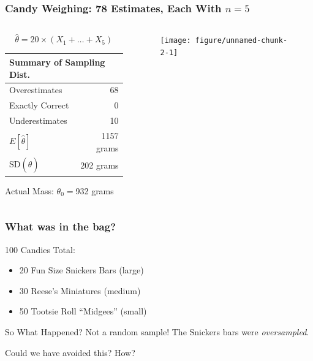 \begin{frame}[fragile]



\frametitle{Candy Weighing: 78 Estimates, Each With $n=5$}

\begin{columns} 
\begin{column}[c]{5cm} 
\small

$$\widehat{\theta} = 20 \times (X_1 + \hdots + X_5)$$

\small
   \begin{tabular}{lr}
   \hline \hline
   \multicolumn{2}{l}{Summary of Sampling Dist.} \\
   \hline
   Overestimates& 68\\
   Exactly Correct& 0\\
   Underestimates& 10\\
   \hline
   $E[\hat{\theta}]$& 1157 grams\\
   SD$(\widehat{\theta})$& 202 grams\\
   \hline
   \end{tabular}
   
  \vspace{1em}
  Actual Mass:  $\theta_0 =$932 grams
\end{column} 
\begin{column}[c]{5cm} 

\begin{figure}
\centering
\begin{knitrout}
\color{fgcolor}

{\centering \texttt{[image: figure/unnamed-chunk-2-1]} 

}



\end{knitrout}


\end{figure}

\end{column} 
\end{columns} 


\end{frame}

\begin{frame}
\frametitle{What was in the bag?}

100 Candies Total:
\begin{itemize}
	\item 20 Fun Size Snickers Bars (large) 
	\item 30 Reese's Miniatures (medium) 
	\item 50 Tootsie Roll ``Midgees'' (small)
\end{itemize}
\begin{block}{So What Happened?}
	\pause Not a random sample! The Snickers bars were \emph{oversampled}.
\end{block}
\begin{block}{Could we have avoided this? How?}

\end{block}
\end{frame}

